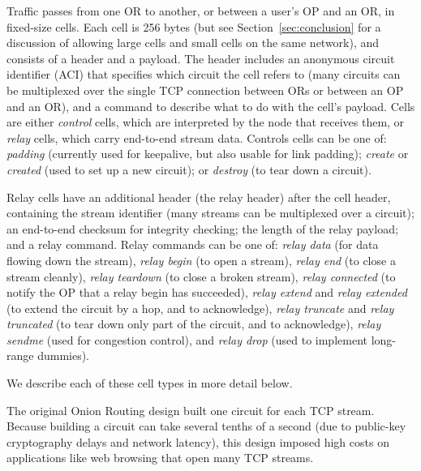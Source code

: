 \documentclass[times,10pt,twocolumn]{article}
\begin{document}
\label{subsec:cells}


Traffic passes from one OR to another, or between a user's OP and an OR,
in fixed-size cells. Each cell is 256 bytes (but see
Section~\ref{sec:conclusion}
for a discussion of allowing large cells and small cells on the same
network), and consists of a header and a payload. The header includes an
anonymous circuit identifier (ACI) that specifies which circuit the
cell refers to
(many circuits can be multiplexed over the single TCP connection between
ORs or between an OP and an OR), and a command to describe what to do
with the cell's payload. Cells are either \emph{control} cells, which are
interpreted by the node that receives them, or \emph{relay} cells,
which carry end-to-end stream data. Controls cells can be one of:
\emph{padding} (currently used for keepalive, but also usable for link
padding); \emph{create} or \emph{created} (used to set up a new circuit);
or \emph{destroy} (to tear down a circuit).

Relay cells have an additional header (the relay header) after the
cell header, containing the stream identifier (many streams can
be multiplexed over a circuit); an end-to-end checksum for integrity
checking; the length of the relay payload; and a relay command. Relay
commands can be one of: \emph{relay
data} (for data flowing down the stream), \emph{relay begin} (to open a
stream), \emph{relay end} (to close a stream cleanly), \emph{relay
teardown} (to close a broken stream), \emph{relay connected}
(to notify the OP that a relay begin has succeeded), \emph{relay
extend} and \emph{relay extended} (to extend the circuit by a hop,
and to acknowledge), \emph{relay truncate} and \emph{relay truncated}
(to tear down only part of the circuit, and to acknowledge), \emph{relay
sendme} (used for congestion control), and \emph{relay drop} (used to
implement long-range dummies).

We describe each of these cell types in more detail below.

\label{subsec:circuits}


The original Onion Routing design built one circuit for each
TCP stream.  Because building a circuit can take several tenths of a
second (due to public-key cryptography delays and network latency),
this design imposed high costs on applications like web browsing that
open many TCP streams.
\end{document}
